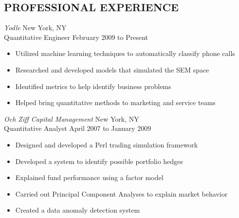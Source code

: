 \documentclass{res}
\begin{document}
\thispagestyle{empty} %


\address{547 2nd Avenue, Apt 4\hspace{0.1in}\vline\hspace{0.1in}New York, NY 10016
\hspace{0.1in}\vline\hspace{0.1in}
dangoldin@gmail.com\hspace{0.1in}\vline\hspace{0.1in}(424) 229-2286}

\begin{resume}

\section{PROFESSIONAL EXPERIENCE}
\vspace{2pt}
{\sl Yodle} \hfill New York, NY \\
Quantitative Engineer \hfill   February 2009 to Present
   \begin{itemize} \itemsep -2pt %
   \item Utilized machine learning techniques to automatically classify phone calls
   \item Researched and developed models that simulated the SEM space
   \item Identified metrics to help identify business problems
   \item Helped bring quantitative methods to marketing and service teams
 \end{itemize} \vspace{-6pt}

{\sl Och Ziff Capital Management} \hfill New York, NY \\
Quantitative Analyst \hfill   April 2007 to January 2009  
   \begin{itemize} \itemsep -2pt %
   \item Designed and developed a Perl trading simulation framework
   \item Developed a system to identify possible portfolio hedges
   \item Explained fund performance using a factor model
   \item Carried out Principal Component Analyses to explain market behavior
   \item Created a data anomaly detection system
 \end{itemize} \vspace{-6pt}


\end{resume}
\end{document}

